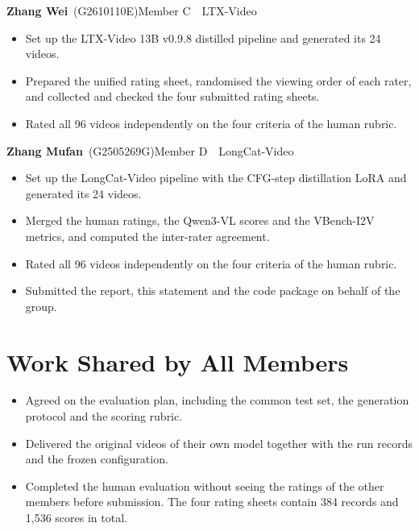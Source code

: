\documentclass[11pt,a4paper]{article}
\newcommand{\member}[4]{%
  \par\addvspace{9pt plus 2pt}%
  \textbf{#2} \,(#3)\hfill\textcolor{accent}{Member #1 \,\textperiodcentered\, #4}\par\nobreak\vspace{-1pt}}
\begin{document}
\member{C}{Zhang Wei}{G2610110E}{LTX-Video}
\begin{itemize}
  \item Set up the LTX-Video 13B v0.9.8 distilled pipeline and generated its 24 videos.
  \item Prepared the unified rating sheet, randomised the viewing order of each rater, and collected and checked the four submitted rating sheets.
  \item Rated all 96 videos independently on the four criteria of the human rubric.
\end{itemize}

\member{D}{Zhang Mufan}{G2505269G}{LongCat-Video}
\begin{itemize}
  \item Set up the LongCat-Video pipeline with the CFG-step distillation LoRA and generated its 24 videos.
  \item Merged the human ratings, the Qwen3-VL scores and the VBench-I2V metrics, and computed the inter-rater agreement.
  \item Rated all 96 videos independently on the four criteria of the human rubric.
  \item Submitted the report, this statement and the code package on behalf of the group.
\end{itemize}

\section{Work Shared by All Members}
\begin{itemize}
  \item Agreed on the evaluation plan, including the common test set, the generation protocol and the scoring rubric.
  \item Delivered the original videos of their own model together with the run records and the frozen configuration.
  \item Completed the human evaluation without seeing the ratings of the other members before submission. The four rating sheets contain 384 records and 1,536 scores in total.
\end{itemize}
\end{document}
